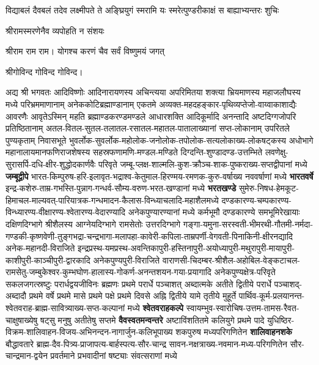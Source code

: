       {विद्याबलं दैवबलं तदेव लक्ष्मीपते ते अङ्घ्रियुगं स्मरामि}
    {यः स्मरेत्पुण्डरीकाक्षं स बाह्याभ्यन्तरः शुचिः}

{श्रीरामस्मरणेनैव व्यपोहति न संशयः}

श्रीराम राम राम। 
{योगश्च करणं चैव सर्वं विष्णुमयं जगत्}

श्रीगोविन्द गोविन्द गोविन्द। 

अद्य श्री भगवतः आदिविष्णोः आदिनारायणस्य अचिन्त्यया अपरिमितया शक्त्या भ्रियमाणस्य महाजलौघस्य मध्ये
परिभ्रम\-माणानाम् अनेक\-कोटि\-ब्रह्माण्डानाम् एकतमे अव्यक्त-महदहङ्कार-पृथिव्यप्तेजो-वाय्वाकाशाद्यैः आवरणैः
आवृते\-ऽस्मिन् महति ब्रह्माण्डकरण्डमण्डले आधारशक्ति आदिकूर्मादि अनन्तादि अष्टदिग्गजोपरि
प्रतिष्ठितानाम् अतल-वितल-सुतल-तलातल-रसातल-महातल-पातालाख्यानां सप्त-लोकानाम् उपरितले
पुण्यकृताम् निवासभूते
भुवर्लोक-सुवर्लोक-महोलोक-जनोलोक-तपोलोक-सत्यलोकाख्य-लोकषट्कस्य अधोभागे महानालायमान\-फणि\-राज\-शेषस्य 
सहस्र\-फणामणि-मण्डल-मण्डिते दिग्दन्ति-शुण्डादण्ड-उत्तम्भिते 
लवणेक्षु-सुरासर्पि-दधि-क्षीर-शुद्धोदकार्णवैः परिवृते
जम्बू-प्लक्ष-शाल्मलि-कुश-क्रौञ्च-शाक-पुष्कराख्य-सप्तद्वीपानां मध्ये \textbf{जम्बूद्वीपे}
भारत-किम्पुरुष-हरि-इलावृत-भद्राश्व-केतुमाल-हिरण्मय-रमणक-कुरु-वर्षाख्य नववर्षाणां मध्ये \textbf{भारतवर्षे}
इन्द्र-कशेरु-ताम्र-गभस्ति-पुन्नाग-गन्धर्व-सौम्य-वरुण-भरत-खण्डानां मध्ये \textbf{भरतखण्डे}
सुमेरु-निषध-हेमकूट-हिमाचल-माल्यवत्-पारियात्रक-गन्धमादन-कैलास-विन्ध्याचलादि-महा\-शैल\-मध्ये
दण्डकारण्य-चम्पकारण्य-विन्ध्यारण्य-वीक्षारण्य-श्वेतारण्य-वेदारण्यादि अनेक\-पुण्या\-रण्यानां मध्ये
कर्मभूमौ दण्डकारण्ये समभूमिरेखायाः दक्षिणदिग्भागे श्रीशैलस्य आग्नेयदिग्भागे रामसेतोः उत्तर\-दिग्भागे
गङ्गा-यमुना-सरस्वती-भीमरथी-गौतमी-नर्मदा-गण्डकी-कृष्णवेणी-तुङ्गभद्रा-चन्द्रभागा-मलापहा-कावेरी-कपिला-ताम्रपर्णी-वेगवती-पिनाकिनी-क्षीरनद्यादि
अनेक-महानदी-विराजिते
इन्द्रप्रस्थ-यमप्रस्थ-अवन्तिका\-पुरी-हस्तिनापुरी-अयोध्या\-पुरी-मथुरा\-पुरी-मायापुरी-काशीपुरी-काञ्चीपुरी-द्वारकादि अनेक\-पुण्यपुरी-विराजिते
वाराणसी-चिदम्बर-श्रीशैल-अहोबिल-वेङ्कटाचल-रामसेतु-जम्बुकेश्वर-कुम्भघोण-हालास्य-गोकर्ण-अनन्तशयन-गया-प्रयागादि
अनेकपुण्यक्षेत्र-परिवृते सकलजगत्स्रष्टुः परार्धद्वयजीविनः ब्रह्मणः प्रथमे परार्धे पञ्चाशत्
अब्दात्मके अतीते द्वितीये परार्धे पञ्चाशद्-अब्दादौ प्रथमे वर्षे प्रथमे मासे प्रथमे पक्षे प्रथमे
दिवसे अह्नि द्वितीये यामे तृतीये मुहूर्ते
पार्थिव-कूर्म-प्रलयानन्त-श्वेतवराह-ब्राह्म-सावित्र्याख्य-सप्त-कल्पानां मध्ये \textbf{श्वेतवराहकल्पे}
स्वायम्भुव-स्वारोचिष-उत्तम-तामस-रैवत-चाक्षुषाख्येषु षट्सु मनुषु अतीतेषु सप्तमे \textbf{वैवस्वतमन्वन्तरे}
अष्टाविंशतितमे कलियुगे प्रथमे पादे युधिष्ठिर-विक्रम-शालिवाहन-विजय-अभिनन्दन-नागार्जुन-कलिभूपाख्य
शकपुरुष मध्यपरि\-गणितेन \textbf{शालिवाहनशके} बौद्धावतारे ब्राह्म-दैव-पित्र्य-प्राजापत्य-बार्हस्पत्य-सौर-चान्द्र
सावन-नक्षत्राख्य-नवमान-मध्य-परि\-गणितेन सौर-चान्द्रमान-द्वयेन प्रवर्तमाने प्रभवादीनां षष्ट्याः
संवत्सराणां मध्ये 
\yutithyadi

